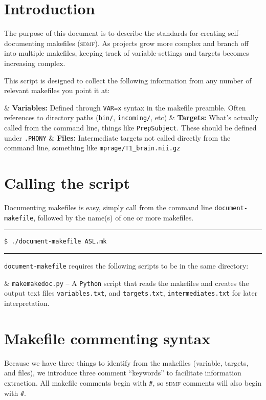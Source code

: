 \documentclass[oneside,11pt]{memoir}
\newcommand{\bashcmd}[1]{ \hfill\, \begin{minipage}[t]{\linewidth}  \hrule \vspace{0.5\baselineskip} \texttt{\small \$ #1} \vspace{0.5\baselineskip} \hrule \end{minipage} \vspace{0.5\baselineskip} }
\begin{document}
	
	\section{Introduction}
	
	The purpose of this document is to describe the standards for creating self-documenting makefiles (\textsc{sdmf}). As projects grow more complex and branch off into multiple makefiles, keeping track of variable-settings and targets becomes increasing complex. 
	
	This script is designed to collect the following information from any number of relevant makefiles you point it at:
	
	\begin{easylist}[itemize]
		& \textbf{Variables:} Defined through \texttt{VAR=x} syntax in the makefile preamble. Often references to directory paths (\texttt{bin/}, \texttt{incoming/}, etc)
		& \textbf{Targets:} What's actually called from the command line, things like \texttt{PrepSubject}. These should be defined under \texttt{.PHONY}
		& \textbf{Files:} Intermediate targets not called directly from the command line, something like \texttt{mprage/T1\_brain.nii.gz}
	\end{easylist}
	
	\section{Calling the script}
	
	Documenting makefiles is easy, simply call from the command line \texttt{document-makefile}, followed by the name(s) of one or more makefiles.	
	\bashcmd{./document-makefile ASL.mk}
	
	\texttt{document-makefile} requires the following scripts to be in the same directory:
	
	\begin{easylist}[itemize]
		& \texttt{makemakedoc.py} -- A \texttt{Python} script that reads the makefiles and creates the output text files \texttt{variables.txt}, and \texttt{targets.txt}, \texttt{intermediates.txt} for later interpretation.
	\end{easylist}
	
	\newpage
	\section{Makefile commenting syntax}
	
	Because we have three things to identify from the makefiles (variable, targets, and files), we introduce three comment ``keywords'' to facilitate information extraction.
	All makefile comments begin with \texttt{\#}, so \textsc{sdmf} comments will also begin with \texttt{\#}. 
	
\end{document}
